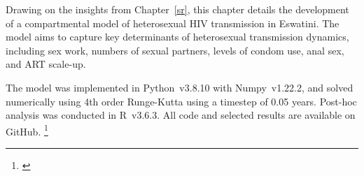 Drawing on the insights from Chapter~\ref{sr},
this chapter details the development of
a compartmental model of heterosexual HIV transmission in Eswatini.
The model aims to capture key determinants of heterosexual transmission dynamics, including
sex work, numbers of sexual partners, levels of condom use, anal sex, and ART scale-up.
\par
The model was implemented in Python~v3.8.10 with Numpy~v1.22.2,
and solved numerically using 4th order Runge-Kutta \cite{Gill1951} using a timestep of 0.05 years.
Post-hoc analysis was conducted in R~v3.6.3.
All code and selected results are available on GitHub.%
\footnote{\label{foot:github}}